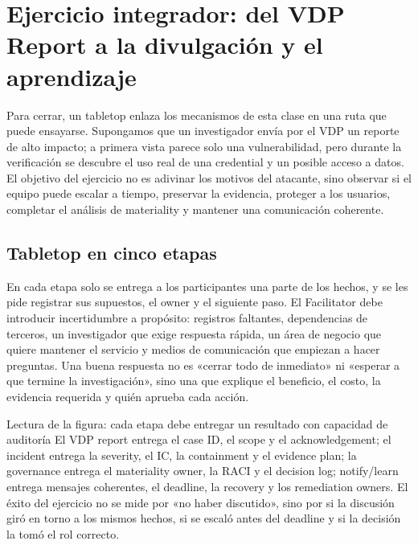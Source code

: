 \section{Ejercicio integrador: del VDP Report a la divulgación y el aprendizaje}

Para cerrar, un tabletop enlaza los mecanismos de esta clase en una ruta que puede ensayarse. Supongamos que un investigador envía por el VDP un reporte de alto impacto; a primera vista parece solo una vulnerabilidad, pero durante la verificación se descubre el uso real de una credential y un posible acceso a datos. El objetivo del ejercicio no es adivinar los motivos del atacante, sino observar si el equipo puede escalar a tiempo, preservar la evidencia, proteger a los usuarios, completar el análisis de materiality y mantener una comunicación coherente.

\subsection{Tabletop en cinco etapas}

En cada etapa solo se entrega a los participantes una parte de los hechos, y se les pide registrar sus supuestos, el owner y el siguiente paso. El Facilitator debe introducir incertidumbre a propósito: registros faltantes, dependencias de terceros, un investigador que exige respuesta rápida, un área de negocio que quiere mantener el servicio y medios de comunicación que empiezan a hacer preguntas. Una buena respuesta no es «cerrar todo de inmediato» ni «esperar a que termine la investigación», sino una que explique el beneficio, el costo, la evidencia requerida y quién aprueba cada acción.


\begin{knowledgebox}{Lectura de la figura: cada etapa debe entregar un resultado con capacidad de auditoría}
El VDP report entrega el case ID, el scope y el acknowledgement; el incident entrega la severity, el IC, la containment y el evidence plan; la governance entrega el materiality owner, la RACI y el decision log; notify/learn entrega mensajes coherentes, el deadline, la recovery y los remediation owners. El éxito del ejercicio no se mide por «no haber discutido», sino por si la discusión giró en torno a los mismos hechos, si se escaló antes del deadline y si la decisión la tomó el rol correcto.
\end{knowledgebox}

